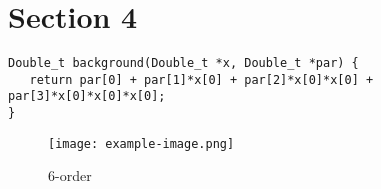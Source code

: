 \documentclass{article}
\begin{document}
\section*{Section 4}

\begin{lstlisting}[caption=Order 3]
    Double_t background(Double_t *x, Double_t *par) {
   return par[0] + par[1]*x[0] + par[2]*x[0]*x[0] + par[3]*x[0]*x[0]*x[0];
}

\end{lstlisting}

\begin{figure}[H]
    \centering
    \texttt{[image: example-image.png]} 
    \caption{6-order}
    \label{fig:graph}
\end{figure}

  
\end{document}

